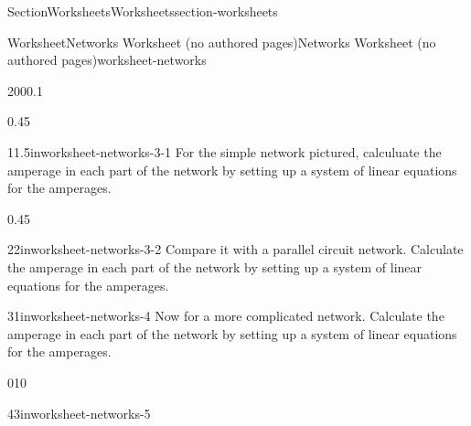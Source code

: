 \documentclass[twoside,10pt,]{article}
\numberwithin{equation}{section}
\begin{document}
\begin{sectionptx}{Section}{Worksheets}{}{Worksheets}{}{}{section-worksheets}
\begin{worksheet-subsection}{Worksheet}{Networks Worksheet (no authored pages)}{}{Networks Worksheet (no authored pages)}{}{}{worksheet-networks}
\begin{sidebyside}{2}{0}{0}{0.1}
\begin{sbspanel}{0.45}
\begin{divisionexercise}{1}{}{1.5in}{worksheet-networks-3-1}
For the simple network pictured, calculuate the amperage in each part of the network by setting up a system of linear equations for the amperages.%
\noindent{}%
\end{divisionexercise}%
\end{sbspanel}%
\begin{sbspanel}{0.45}%
\begin{divisionexercise}{2}{}{2in}{worksheet-networks-3-2}%
Compare it with a parallel circuit network. Calculate the amperage in each part of the network by setting up a system of linear equations for the amperages.%
\noindent{}%
\end{divisionexercise}%
\end{sbspanel}%
\end{sidebyside}%
\begin{divisionexercise}{3}{}{1in}{worksheet-networks-4}%
Now for a more complicated network. Calculate the amperage in each part of the network by setting up a system of linear equations for the amperages.%
\begin{image}{0}{1}{0}{}%
%
\end{image}%
\end{divisionexercise}%
\begin{divisionexercise}{4}{}{3in}{worksheet-networks-5}%

\end{divisionexercise}
\end{worksheet-subsection}
\end{sectionptx}
\end{document}
